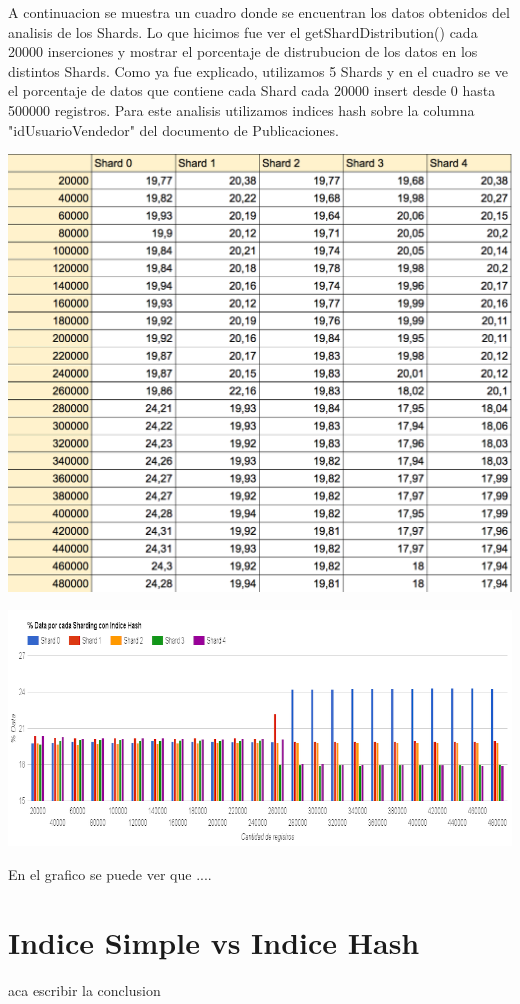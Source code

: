 \documentclass[a4paper, 10pt, twoside]{article}
\begin{document}
A continuacion se muestra un cuadro donde se encuentran los datos obtenidos del analisis de los Shards. Lo que hicimos fue ver el getShardDistribution() cada 20000 inserciones y mostrar el porcentaje de distrubucion de los datos en los distintos Shards.
Como ya fue explicado, utilizamos 5 Shards y en el cuadro se ve el porcentaje de datos que contiene cada Shard cada 20000 insert desde 0 hasta 500000 registros.
Para este analisis utilizamos indices hash sobre la columna "idUsuarioVendedor" del documento de Publicaciones.


\begin{center}
\includegraphics[scale=0.7]{resultado_indice_hash.png}
\end{center}
\includegraphics[scale=0.5]{indice_hash.png}

En el grafico se puede ver que ....

\section{Indice Simple vs Indice Hash}
aca escribir la conclusion 
\end{document}
